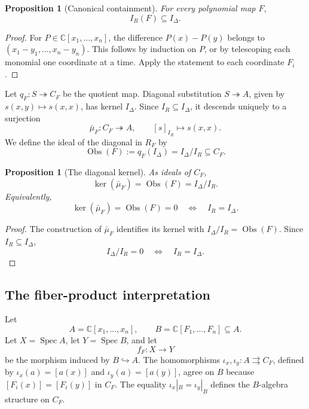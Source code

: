 \documentclass[11pt]{article}
\newtheorem{proposition}[theorem]{Proposition}
\theoremstyle{remark}
\DeclareMathOperator{\Spec}{Spec}
\newcommand{\C}{\mathbb C}
\newcommand{\Obs}{\operatorname{Obs}}
\begin{document}
\begin{proposition}[Canonical containment]
\label{prop:collision-contained-in-diagonal}
For every polynomial map \(F\),
\[
  I_R(F)\subseteq I_\Delta.
\]
\end{proposition}

\begin{proof}
For \(P\in\C[x_1,\dots,x_n]\), the difference \(P(x)-P(y)\) belongs to
\((x_1-y_1,\dots,x_n-y_n)\).  This follows by induction on \(P\), or by
telescoping each monomial one coordinate at a time.  Apply the statement
to each coordinate \(F_i\).
\end{proof}

Let \(q_F\colon S\twoheadrightarrow C_F\) be the quotient map.  Diagonal
substitution \(S\twoheadrightarrow A\), given by
\(s(x,y)\mapsto s(x,x)\), has kernel \(I_\Delta\).  Since
\(I_R\subseteq I_\Delta\), it descends uniquely to a surjection
\[
  \bar\mu_F\colon C_F\twoheadrightarrow A,
  \qquad
  [s]_{I_R}\longmapsto s(x,x).
\]
We define the ideal of the diagonal in \(R_F\) by
\[
  \Obs(F):=q_F(I_\Delta)=I_\Delta/I_R\subseteq C_F.
\]

\begin{proposition}[The diagonal kernel]
\label{prop:obstruction-kernel}
As ideals of \(C_F\),
\[
  \ker(\bar\mu_F)
  =
  \Obs(F)
  =
  I_\Delta/I_R.
\]
Equivalently,
\[
  \ker(\bar\mu_F)=\Obs(F)=0
  \quad\Longleftrightarrow\quad
  I_R=I_\Delta.
\]
\end{proposition}

\begin{proof}
The construction of \(\bar\mu_F\) identifies its kernel with
\(I_\Delta/I_R=\Obs(F)\).  Since \(I_R\subseteq I_\Delta\),
\[
  I_\Delta/I_R=0
  \quad\Longleftrightarrow\quad
  I_R=I_\Delta.
\]
\end{proof}

\subsection{The fiber-product interpretation}
\label{sec:fiber-product}

Let
\[
  A=\C[x_1,\dots,x_n],\qquad
  B=\C[F_1,\dots,F_n]\subseteq A.
\]
Let \(X=\Spec A\), let \(Y=\Spec B\), and let
\[
  f_F\colon X\longrightarrow Y
\]
be the morphism induced by \(B\hookrightarrow A\).
The homomorphisms
\(\iota_x,\iota_y\colon A\rightrightarrows C_F\), defined by
\(\iota_x(a)=[a(x)]\) and \(\iota_y(a)=[a(y)]\), agree on \(B\) because
\([F_i(x)]=[F_i(y)]\) in \(C_F\).  The equality
\(\iota_x|_B=\iota_y|_B\) defines the \(B\)-algebra structure on \(C_F\).
\end{document}
